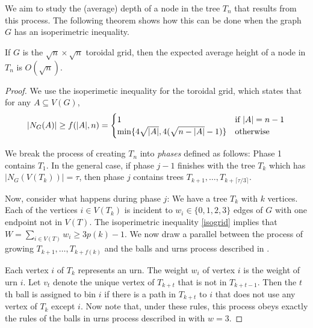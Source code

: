 \documentclass[lotsofwhite]{patmorin}
\begin{document}
We aim to study the (average) depth of a node in the tree $T_n$ that
results from this process.  The following theorem shows how this can
be done when the graph $G$ has an isoperimetric inequality.


\begin{thm}
   If $G$ is the $\sqrt{n}\times\sqrt{n}$ toroidal grid, then the 
   expected average height of a node in $T_n$ is $O(\sqrt{n})$.
\end{thm}

\begin{proof}
   We use the isoperimetic inequality for the toroidal grid, which states
   that for any $A\subseteq V(G)$,
  \begin{equation}
        |N_G(A)| \ge f(|A|,n)=\begin{cases}
          1 & \text{if $|A|=n-1$} \\
          \min\{4\sqrt{|A|}, 4(\sqrt{n-|A|}-1)\} & \text{otherwise}
        \end{cases} 
     \eqlabel{isogrid}
  \end{equation}


  We break the process of creating $T_n$ into \emph{phases} defined
  as follows: Phase 1 contains $T_1$.  In the general case, if phase
  $j-1$ finishes with the tree $T_k$ which has $|N_G(V(T_k))|=\tau$, then phase $j$ contains trees
  $T_{k+1},\ldots,T_{k+\lceil\tau/3\rceil}$.

  Now, consider what happens during phase $j$: We have a tree $T_k$
  with $k$ vertices. Each of the vertices $i\in V(T_k)$ is incident
  to $w_i\in\{0,1,2,3\}$ edges of $G$ with one endpoint not in $V(T)$.
  The isoperimetric inequality \eqref{isogrid} implies that $W=\sum_{i\in
  V(T)} w_i \ge 3p(k)-1$.  We now draw a parallel between the process of
  growing $T_{k+1},\ldots,T_{k+f(k)}$ and the balls and urns process
  described in .

  Each vertex $i$ of $T_k$ represents an urn.  The weight $w_i$ of vertex
  $i$ is the weight of urn $i$.  Let $v_t$ denote the unique vertex of
  $T_{k+t}$ that is not in $T_{k+t-1}$.  Then the $t$th ball is assigned
  to bin $i$ if there is a path in $T_{k+t}$ to $i$ that does not use
  any vertex of $T_{k}$ except $i$.  Now note that, under these rules,
  this process obeys exactly the rules of the balls in urns process
  described in  with $w=3$.


\end{proof}
\end{document}

